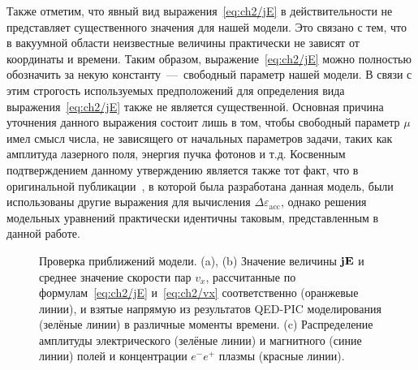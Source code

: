 Также отметим, что явный вид выражения~\eqref{eq:ch2/jE} в действительности не представляет существенного значения для нашей модели.
Это связано с тем, что в вакуумной области неизвестные величины практически не зависят от координаты и времени.
Таким образом, выражение~\eqref{eq:ch2/jE} можно полностью обозначить за некую константу~---~свободный параметр нашей модели.
В связи с этим строгость используемых предположений для определения вида выражения~\eqref{eq:ch2/jE} также не является существенной.
Основная причина уточнения данного выражения состоит лишь в том, чтобы свободный параметр $\mu$ имел смысл числа, не зависящего от начальных параметров задачи, таких как амплитуда лазерного поля, энергия пучка фотонов и т.д.
Косвенным подтверждением данному утверждению является также тот факт, что в оригинальной публикации~\cite{samsonov2021hydrodynamical}, в которой была разработана данная модель, были использованы другие выражения для вычисления $\Delta\varepsilon_\mathrm{acc}$, однако решения модельных уравнений практически идентичны таковым, представленным в данной работе.

\begin{figure}[ht]
    \caption[Проверка приближений аналитической модели развития КЭД каскада в плоской волне]{\label{fig:ch2/sec3/assumptions} 
    Проверка приближений модели. (a), (b) Значение величины $\vb{jE}$ и среднее значение скорости пар $v_x$, рассчитанные по формулам~\eqref{eq:ch2/jE} и~\eqref{eq:ch2/vx} соответственно (оранжевые линии), и взятые напрямую из результатов QED-PIC моделирования (зелёные линии) в различные моменты времени. (c) Распределение амплитуды электрического (зелёные линии) и магнитного (синие линии) полей и концентрации $e^-e^+$ плазмы (красные линии). }
\end{figure}

